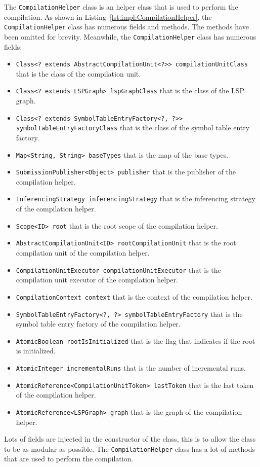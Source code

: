 The \texttt{CompilationHelper} class is an helper class that is used to perform the compilation. As shown in Listing~\ref{lst:impl:CompilationHelper}, the \texttt{CompilationHelper} class has numerous fields and methods. The methods have been omitted for brevity. Meanwhile, the \texttt{CompilationHelper} class has numerous fields:

\begin{itemize}
  \item \texttt{Class<? extends AbstractCompilationUnit<?>> compilationUnitClass} that is the class of the compilation unit.
  \item \texttt{Class<? extends LSPGraph> lspGraphClass} that is the class of the LSP graph.
  \item \texttt{Class<? extends SymbolTableEntryFactory<?, ?>> symbolTableEntryFactoryClass} that is the class of the symbol table entry factory.
  \item \texttt{Map<String, String> baseTypes} that is the map of the base types.
  \item \texttt{SubmissionPublisher<Object> publisher} that is the publisher of the compilation helper.
  \item \texttt{InferencingStrategy inferencingStrategy} that is the inferencing strategy of the compilation helper.
  \item \texttt{Scope<ID> root} that is the root scope of the compilation helper.
  \item \texttt{AbstractCompilationUnit<ID> rootCompilationUnit} that is the root compilation unit of the compilation helper.
  \item \texttt{CompilationUnitExecutor compilationUnitExecutor} that is the compilation unit executor of the compilation helper.
  \item \texttt{CompilationContext context} that is the context of the compilation helper.
  \item \texttt{SymbolTableEntryFactory<?, ?> symbolTableEntryFactory} that is the symbol table entry factory of the compilation helper.
  \item \texttt{AtomicBoolean rootIsInitialized} that is the flag that indicates if the root is initialized.
  \item \texttt{AtomicInteger incrementalRuns} that is the number of incremental runs.
  \item \texttt{AtomicReference<CompilationUnitToken> lastToken} that is the last token of the compilation helper.
  \item \texttt{AtomicReference<LSPGraph> graph} that is the graph of the compilation helper.
\end{itemize}

Lots of fields are injected in the constructor of the class, this is to allow the class to be as modular as possible. The \texttt{CompilationHelper} class has a lot of methods that are used to perform the compilation.


